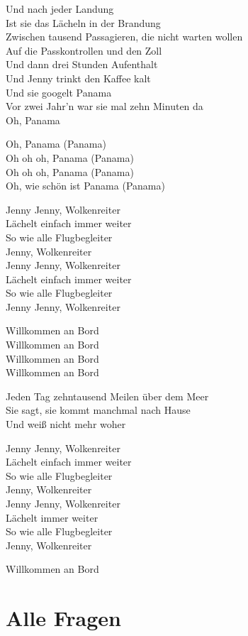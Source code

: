 \documentclass[]{book}
\begin{document}
Und nach jeder Landung\\
Ist sie das Lächeln in der Brandung\\
Zwischen tausend Passagieren, die nicht warten wollen\\
Auf die Passkontrollen und den Zoll\\
Und dann drei Stunden Aufenthalt\\
Und Jenny trinkt den Kaffee kalt\\
Und sie googelt Panama\\
Vor zwei Jahr'n war sie mal zehn Minuten da\\
Oh, Panama

Oh, Panama (Panama)\\
Oh oh oh, Panama (Panama)\\
Oh oh oh, Panama (Panama)\\
Oh, wie schön ist Panama (Panama)

Jenny Jenny, Wolkenreiter\\
Lächelt einfach immer weiter\\
So wie alle Flugbegleiter\\
Jenny, Wolkenreiter\\
Jenny Jenny, Wolkenreiter\\
Lächelt einfach immer weiter\\
So wie alle Flugbegleiter\\
Jenny Jenny, Wolkenreiter

Willkommen an Bord\\
Willkommen an Bord\\
Willkommen an Bord\\
Willkommen an Bord

Jeden Tag zehntausend Meilen über dem Meer\\
Sie sagt, sie kommt manchmal nach Hause\\
Und weiß nicht mehr woher

Jenny Jenny, Wolkenreiter\\
Lächelt einfach immer weiter\\
So wie alle Flugbegleiter\\
Jenny, Wolkenreiter\\
Jenny Jenny, Wolkenreiter\\
Lächelt immer weiter\\
So wie alle Flugbegleiter\\
Jenny, Wolkenreiter

Willkommen an Bord

\hypertarget{alle-fragen}{%
\section{Alle Fragen}\label{alle-fragen}}
\end{document}
